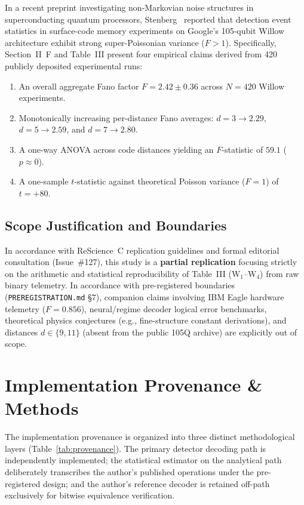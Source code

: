 \documentclass[10pt,a4paper,onecolumn]{article}
\begin{document}
In a recent preprint investigating non-Markovian noise structures in superconducting quantum processors, Stenberg~\cite{stenberg2026rotation} reported that detection event statistics in surface-code memory experiments on Google's 105-qubit Willow architecture exhibit strong super-Poissonian variance ($F > 1$). Specifically, Section~II~F and Table~III present four empirical claims derived from 420 publicly deposited experimental runs:
\begin{enumerate}
    \item[\textbf{W1.}] An overall aggregate Fano factor $F = 2.42 \pm 0.36$ across $N=420$ Willow experiments.
    \item[\textbf{W2.}] Monotonically increasing per-distance Fano averages: $d=3 \to 2.29$, $d=5 \to 2.59$, and $d=7 \to 2.80$.
    \item[\textbf{W3.}] A one-way ANOVA across code distances yielding an $F$-statistic of $59.1$ ($p \approx 0$).
    \item[\textbf{W4.}] A one-sample $t$-statistic against theoretical Poisson variance ($F=1$) of $t = +80$.
\end{enumerate}

\subsection{Scope Justification and Boundaries}
In accordance with ReScience~C replication guidelines and formal editorial consultation (Issue~\#127), this study is a \textbf{partial replication} focusing strictly on the arithmetic and statistical reproducibility of Table~III ($\text{W}_1$--$\text{W}_4$) from raw binary telemetry. In accordance with pre-registered boundaries (\texttt{PREREGISTRATION.md} \S7), companion claims involving IBM Eagle hardware telemetry ($F=0.856$), neural/regime decoder logical error benchmarks, theoretical physics conjectures (e.g., fine-structure constant derivations), and distances $d \in \{9, 11\}$ (absent from the public 105Q archive) are explicitly out of scope.

\section{Implementation Provenance \& Methods}

The implementation provenance is organized into three distinct methodological layers (Table~\ref{tab:provenance}). The primary detector decoding path is independently implemented; the statistical estimator on the analytical path deliberately transcribes the author's published operations under the pre-registered design; and the author's reference decoder is retained off-path exclusively for bitwise equivalence verification.
\end{document}
